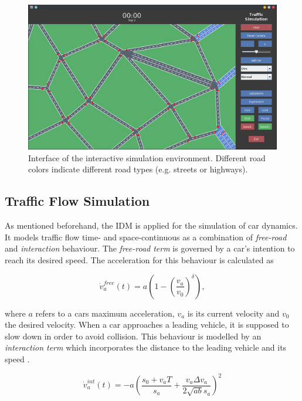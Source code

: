 \documentclass[10pt]{article}
\begin{document}
\begin{figure}
	\includegraphics[width=\linewidth]{img/interface.png}
	\caption{Interface of the interactive simulation environment. Different road colors indicate different road types (e.g. streets or highways). \label{fig:interface}}
\end{figure}
	
\subsection{Traffic Flow Simulation}
As mentioned beforehand, the IDM \citep{treiber2000congested} is applied for the simulation of car dynamics. It models traffic flow time- and space-continuous as a combination of \textit{free-road} and \textit{interaction} behaviour. The \textit{free-road term} is governed by a car's intention to reach its desired speed. The acceleration for this behaviour is calculated \citep{treiber2000congested} as

\begin{equation}
	\label{eq:free-road-term}
	\dot{v}_a^{free}(t) = a ( 1 - ( \frac{v_a}{v_0} )^\delta),
\end{equation}

where $a$ refers to a cars maximum acceleration, $v_a$ is its current velocity and $v_0$ the desired velocity. When a car approaches a leading vehicle, it is supposed to slow down in order to avoid collision. This behaviour is modelled by an \textit{interaction term} which incorporates the distance to the leading vehicle and its speed \citep{treiber2000congested}. 

\begin{equation}
	\label{eq:int-term}
	\dot{v}_a^{int}(t) = - a ( \frac{s_0 + v_a T}{s_a} + \frac{v_a \Delta v_a}{2 \sqrt{ab} s_a} )^2
\end{equation}
\end{document}
